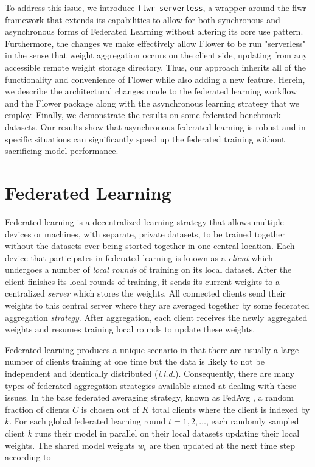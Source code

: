 \documentclass[twocolumn, switch]{article} %
\begin{document}
To address this issue, we introduce \texttt{flwr-serverless}, a wrapper around the flwr framework that extends its capabilities to allow for both synchronous and asynchronous forms of Federated Learning without altering its core use pattern. Furthermore, the changes we make effectively allow Flower to be run "serverless" in the sense that weight aggregation occurs on the client side, updating from any accessible remote weight storage directory. Thus, our approach inherits all of the functionality and convenience of Flower while also adding a new feature. Herein, we describe the architectural changes made to the federated learning workflow and the Flower package along with the asynchronous learning strategy that we employ. Finally, we demonstrate the results on some federated benchmark datasets. Our results show that asynchronous federated learning is robust and in specific situations can significantly speed up the federated training without sacrificing model performance.  

\section{Federated Learning}

Federated learning is a decentralized learning strategy that allows multiple devices or machines, with separate, private datasets, to be trained together without the datasets ever being storted together in one central location. Each device that participates in federated learning is known as a \textit{client} which undergoes a number of \textit{local rounds} of training on its local dataset. After the client finishes its local rounds of training, it sends its current weights to a centralized \textit{server} which stores the weights. All connected clients send their weights to this central server where they are averaged together by some federated aggregation \textit{strategy}. After aggregation, each client receives the newly aggregated weights and resumes training local rounds to update these weights.

Federated learning produces a unique scenario in that there are usually a large number of clients training at one time but the data is likely to not be independent and identically distributed (\textit{i.i.d.}). Consequently, there are many types of federated aggregation strategies available aimed at dealing with these issues. In the base federated averaging strategy, known as FedAvg \cite{fed_2}, a random fraction of clients $C$ is chosen out of $K$ total clients where the client is indexed by $k$. For each global federated learning round $t=1, 2, \dots$, each randomly sampled client $k$ runs their model in parallel on their local datasets updating their local weights. The shared model weights $w_t$ are then updated at the next time step according to
\end{document}
